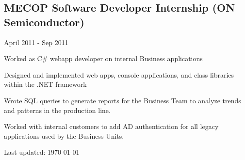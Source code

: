 \documentclass[10pt,letterpaper]{article}
\renewenvironment{itemize}{
  \begin{list}{}{
    \setlength{\leftmargin}{1.5em}
    \setlength{\itemsep}{0.25em}
    \setlength{\parskip}{0pt}
    \setlength{\parsep}{0.25em}
  }
}{
  \end{list}
}
\begin{document}
\subsection*{MECOP Software Developer Internship (ON Semiconductor)}
\begin{itemize}

    \item April 2011 - Sep 2011
    \item Worked as C\# webapp developer on internal Business applications
    \item Designed and implemented web apps, console applications, and class libraries within the .NET framework 
    \item Wrote SQL queries to generate reports for the Business Team to analyze trends and patterns in the production line.
    \item Worked with internal customers to add AD authentication for all legacy applications used by the Business Units. 

\end{itemize}


\bigskip

\begin{center}
  \begin{small}
    Last updated: \today
  \end{small}
\end{center}
\end{document}
